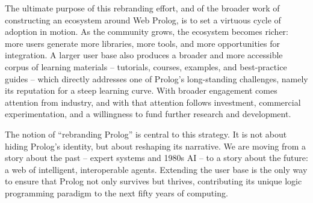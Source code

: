 
The ultimate purpose of this rebranding effort, and of the broader work of constructing an ecosystem around Web Prolog, is to set a virtuous cycle of adoption in motion. As the community grows, the ecosystem becomes richer: more users generate more libraries, more tools, and more opportunities for integration. A larger user base also produces a broader and more accessible corpus of learning materials -- tutorials, courses, examples, and best-practice guides -- which directly addresses one of Prolog's long-standing challenges, namely its reputation for a steep learning curve. With broader engagement comes attention from industry, and with that attention follows investment, commercial experimentation, and a willingness to fund further research and development.

The notion of ``rebranding Prolog'' is central to this strategy. It is not about hiding Prolog's identity, but about reshaping its narrative. We are moving from a story about the past -- expert systems and 1980s AI -- to a story about the future: a web of intelligent, interoperable agents. Extending the user base is the only way to ensure that Prolog not only survives but thrives, contributing its unique logic programming paradigm to the next fifty years of computing.




